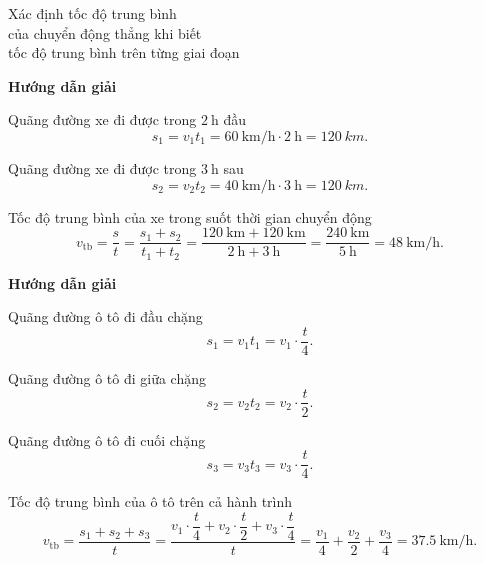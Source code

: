 \begin{dang}{Xác định tốc độ trung bình\\ của chuyển động thẳng khi biết \\tốc độ trung bình trên từng giai đoạn}
	{	\begin{center}
			\textbf{Hướng dẫn giải}
		\end{center}
		
		Quãng đường xe đi được trong $\SI{2}{\hour}$ đầu 
		\begin{equation*}
			s_1 = v_1t_1 =\SI{60}{\kilo\meter/\hour}\cdot\SI{2}{\hour} = \SI{120}{km}.
		\end{equation*}
		
		Quãng đường xe đi được trong $\SI{3}{\hour}$ sau 
		\begin{equation*}
			s_2 = v_2t_2 =\SI{40}{\kilo\meter/\hour}\cdot\SI{3}{\hour}= \SI{120}{km}.
		\end{equation*}
		
		Tốc độ trung bình của xe trong suốt thời gian chuyển động 
		\begin{equation*}
			v_{\text{tb}}=\dfrac{s}{t}=\dfrac{s_1+s_2}{t_1+t_2}=\dfrac{\SI{120}{\kilo\meter}+\SI{120}{\kilo\meter}}{\SI{2}{\hour}+\SI{3}{\hour}}=\dfrac{\SI{240}{\kilo\meter}}{\SI{5}{\hour}}=\SI{48}{\km/\hour}.
		\end{equation*}
		
	}
	{	\begin{center}
			\textbf{Hướng dẫn giải}
		\end{center}
		
		Quãng đường ô tô đi đầu chặng 
		\begin{equation*}
			s_1=v_1t_1=v_1\cdot\dfrac{t}{4}.
		\end{equation*}
		
		Quãng đường ô tô đi giữa chặng 
		\begin{equation*}
			s_2=v_2t_2=v_2\cdot\dfrac{t}{2}.
		\end{equation*}
		
		Quãng đường ô tô đi cuối chặng 
		\begin{equation*}
			s_3=v_3t_3=v_3\cdot\dfrac{t}{4}.
		\end{equation*}
		
		Tốc độ trung bình của ô tô trên cả hành trình 
		\begin{equation*}
			v_{\text{tb}}=\dfrac{s_1+s_2+s_3}{t}=\dfrac{v_1\cdot\dfrac{t}{4}+v_2\cdot\dfrac{t}{2}+v_3\cdot\dfrac{t}{4}}{t}=\dfrac{v_1}{4}+\dfrac{v_2}{2}+\dfrac{v_3}{4}=\SI{37,5}{\km/\hour}.
		\end{equation*}
	}
\end{dang}


